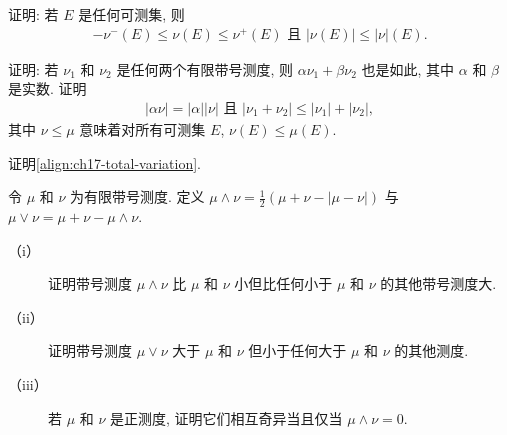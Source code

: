 \documentclass[../../main.tex]{subfiles}
\begin{document}
\begin{exercise}\label{exercise:ch17-14}
证明: 若 $E$ 是任何可测集, 则
\begin{align*}
-\nu^{-}(E)\leqslant\nu(E)\leqslant\nu^{+}(E)\text{ 且 }|\nu(E)|\leqslant|\nu|(E).
\end{align*}
\end{exercise}

\begin{exercise}\label{exercise:ch17-15}
证明: 若 $\nu_{1}$ 和 $\nu_{2}$ 是任何两个有限带号测度, 则 $\alpha\nu_{1}+\beta\nu_{2}$ 也是如此, 其中 $\alpha$ 和 $\beta$ 是实数. 证明
\begin{align*}
|\alpha\nu|=|\alpha||\nu|\text{ 且 }|\nu_{1}+\nu_{2}|\leqslant|\nu_{1}|+|\nu_{2}|,
\end{align*}
其中 $\nu\leqslant\mu$ 意味着对所有可测集 $E$, $\nu(E)\leqslant\mu(E)$.
\end{exercise}

\begin{exercise}\label{exercise:ch17-16}
证明\eqref{align:ch17-total-variation}.
\end{exercise}

\begin{exercise}\label{exercise:ch17-17}
令 $\mu$ 和 $\nu$ 为有限带号测度. 定义 $\mu\wedge\nu=\frac{1}{2}(\mu+\nu-|\mu-\nu|)$ 与 $\mu\vee\nu=\mu+\nu-\mu\wedge\nu$.
\begin{description}
\item[（i）] 证明带号测度 $\mu\wedge\nu$ 比 $\mu$ 和 $\nu$ 小但比任何小于 $\mu$ 和 $\nu$ 的其他带号测度大.
\item[（ii）] 证明带号测度 $\mu\vee\nu$ 大于 $\mu$ 和 $\nu$ 但小于任何大于 $\mu$ 和 $\nu$ 的其他测度.
\item[（iii）] 若 $\mu$ 和 $\nu$ 是正测度, 证明它们相互奇异当且仅当 $\mu\wedge\nu=0$.
\end{description}
\end{exercise}
\end{document}
